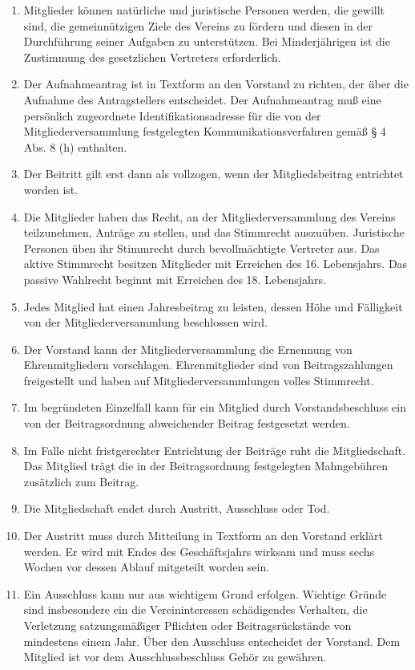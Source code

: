 \documentclass[12pt,a4paper]{article}
\begin{document}
\begin{enumerate}
\item Mitglieder können natürliche und juristische Personen werden, die gewillt sind, die gemeinnützigen Ziele des Vereins zu fördern und diesen in der Durchführung seiner Aufgaben zu unterstützen. Bei Minderjährigen ist die Zustimmung des gesetzlichen Vertreters erforderlich.
\item Der Aufnahmeantrag ist in Textform an den Vorstand zu richten, der über die Aufnahme des Antragstellers entscheidet. Der Aufnahmeantrag muß eine persönlich zugeordnete Identifikationsadresse für die von der Mitgliederversammlung festgelegten Kommunikationsverfahren gemäß § 4 Abs. 8 (h) enthalten. 
\item Der Beitritt gilt erst dann als vollzogen, wenn der Mitgliedsbeitrag entrichtet worden ist.
\item Die Mitglieder haben das Recht, an der Mitgliederversammlung des Vereins teilzunehmen, Anträge zu stellen, und das Stimmrecht auszuüben. Juristische Personen üben ihr Stimmrecht durch bevollmächtigte Vertreter aus. Das aktive Stimmrecht besitzen Mitglieder mit Erreichen des 16. Lebensjahrs. Das passive Wahlrecht beginnt mit Erreichen des 18. Lebensjahrs.
\item Jedes Mitglied hat einen Jahresbeitrag zu leisten, dessen Höhe und Fälligkeit von der Mitgliederversammlung beschlossen wird.
\item Der Vorstand kann der Mitgliederversammlung die Ernennung von Ehrenmitgliedern vorschlagen. Ehrenmitglieder sind von Beitragszahlungen freigestellt und haben auf Mitgliederversammlungen volles Stimmrecht.
\item Im begründeten Einzelfall kann für ein Mitglied durch Vorstandsbeschluss ein von der Beitragsordnung abweichender Beitrag festgesetzt werden.
\item Im Falle nicht fristgerechter Entrichtung der Beiträge ruht die Mitgliedschaft. Das Mitglied trägt die in der Beitragsordnung festgelegten Mahngebühren zusätzlich zum Beitrag.
\item Die Mitgliedschaft endet durch Austritt, Ausschluss oder Tod.
\item Der Austritt muss durch Mitteilung in Textform an den Vorstand erklärt werden. Er wird mit Endes des Geschäftsjahrs wirksam und muss sechs Wochen vor dessen Ablauf mitgeteilt worden sein.
\item Ein Ausschluss kann nur aus wichtigem Grund erfolgen. Wichtige Gründe sind insbesondere ein die Vereininteressen schädigendes Verhalten, die Verletzung satzungsmäßiger Pflichten oder Beitragsrückstände von mindestens einem Jahr. Über den Ausschluss entscheidet der Vorstand. Dem Mitglied ist vor dem Ausschlussbeschluss Gehör zu gewähren.

\end{enumerate}
\end{document}
